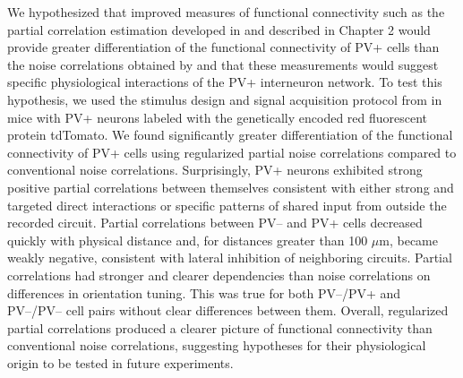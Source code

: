 We hypothesized that improved measures of functional connectivity such as the partial correlation estimation developed in \cite{Yatsenko:2014} and described in Chapter 2 would provide greater differentiation of the functional connectivity of PV+ cells than the noise correlations obtained by \cite{Hofer:2011} and that these measurements would suggest specific physiological interactions of the PV+ interneuron network. 
To test this hypothesis, we used the stimulus design and signal acquisition protocol from \cite{Yatsenko:2014} in mice with PV+ neurons labeled with the genetically encoded red fluorescent protein tdTomato. 
We found significantly greater differentiation of the functional connectivity of PV+ cells using regularized partial noise correlations compared to conventional noise correlations.  Surprisingly, PV+ neurons exhibited strong positive partial correlations between themselves consistent with either strong and targeted direct interactions or specific patterns of shared input from outside the recorded circuit. Partial correlations between PV-- and PV+ cells decreased quickly with physical distance and, for distances greater than 100 $\mu$m, became weakly negative, consistent with lateral inhibition of neighboring circuits. Partial correlations had stronger and clearer dependencies than noise correlations on differences in orientation tuning. This was true for both PV--/PV+ and PV--/PV-- cell pairs without clear differences between them. Overall, regularized partial correlations produced a clearer picture of functional connectivity than conventional noise correlations, suggesting hypotheses for their physiological origin to be tested in future experiments.
